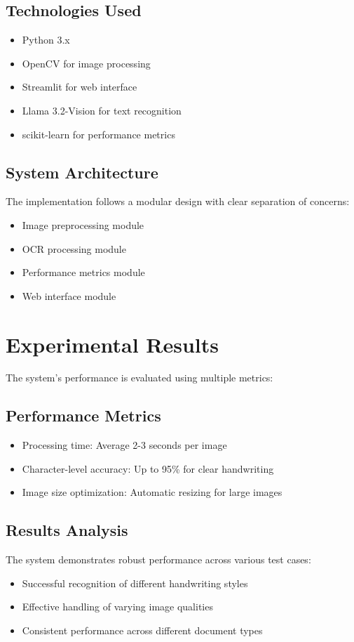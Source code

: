 \documentclass[a4paper,12pt]{article}
\begin{document}
\subsection{Technologies Used}
\begin{itemize}
    \item Python 3.x
    \item OpenCV for image processing
    \item Streamlit for web interface
    \item Llama 3.2-Vision for text recognition
    \item scikit-learn for performance metrics
\end{itemize}

\subsection{System Architecture}
The implementation follows a modular design with clear separation of concerns:
\begin{itemize}
    \item Image preprocessing module
    \item OCR processing module
    \item Performance metrics module
    \item Web interface module
\end{itemize}

\section{Experimental Results}
The system's performance is evaluated using multiple metrics:

\subsection{Performance Metrics}
\begin{itemize}
    \item Processing time: Average 2-3 seconds per image
    \item Character-level accuracy: Up to 95\% for clear handwriting
    \item Image size optimization: Automatic resizing for large images
\end{itemize}

\subsection{Results Analysis}
The system demonstrates robust performance across various test cases:
\begin{itemize}
    \item Successful recognition of different handwriting styles
    \item Effective handling of varying image qualities
    \item Consistent performance across different document types
\end{itemize}
\end{document}
